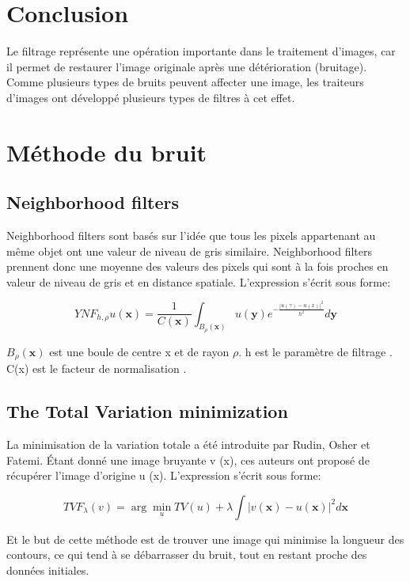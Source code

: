 \documentclass[12pt,a4paper]{report}
\numberwithin{equation}{subsection}
\numberwithin{equation}{section}
\begin{document}
\section{Conclusion}
Le filtrage représente une opération importante dans le traitement d’images, car il permet
de restaurer l’image originale après une détérioration (bruitage).\newline
Comme plusieurs types de bruits peuvent affecter une image, les traiteurs d’images ont
développé plusieurs types de filtres à cet effet.



\newpage
\section{Méthode du bruit}
\subsection{Neighborhood filters}
\newline
Neighborhood filters sont basés sur l'idée que tous les pixels appartenant au même objet ont une valeur de niveau de gris similaire.
\newline
 Neighborhood filters prennent donc une moyenne des valeurs des pixels qui sont à la fois proches en valeur de niveau de gris et en distance spatiale.
 \newline
L'expression s'écrit sous forme:
 \newline
 \newline
 \newline
 \begin{figure}[h!]
$$Y N F_{h, \rho} u(\mathbf{x})=\frac{1}{C(\mathbf{x})} \int_{B_{\rho}(\mathbf{x})} u(\mathbf{y}) e^{-\frac{|u(\gamma)-u(x)|^{2}}{h^{2}}} d \mathbf{y}$$
\end{figure}
\newline
 $B_{\rho}(\mathbf{x})$ est une boule de centre x et de rayon ${\rho}$.\newline
 h est le paramètre de filtrage .\newline
 C(x) est le facteur de normalisation .\newline
\subsection{The Total Variation minimization}
La minimisation de la variation totale a été introduite par
Rudin, Osher et Fatemi. Étant donné une image bruyante v (x),
ces auteurs ont proposé de récupérer l'image d'origine u (x).
\newline
L'expression s'écrit sous forme:
\newline
 \begin{figure}[h!]
   $$ T V F_{\lambda}(v)=\arg \min _{u} T V(u)+\lambda \int|v(\mathbf{x})-u(\mathbf{x})|^{2} d \mathbf{x}$$
\end{figure}
\newline
Et le but de cette méthode est de trouver une image qui minimise la longueur des contours, ce qui tend à se débarrasser du bruit, tout en restant proche des données initiales.
\newpage
\end{document}
